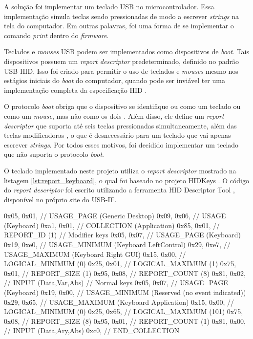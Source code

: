 \documentclass[brazil,pagestart=firstchapter]{abnt}
\begin{document}
A solução foi implementar um teclado \ac{USB} no microcontrolador. Essa
implementação simula teclas sendo pressionadas de modo a escrever
\textit{strings} na tela do computador. Em outras palavras, foi uma forma de
se implementar o comando \textit{print} dentro do \textit{firmware}.

Teclados e \textit{mouses} \ac{USB} podem ser implementados como
dispositivos de \textit{boot}. Tais dispositivos possuem um \textit{report
descriptor} predeterminado, definido no padrão \ac{USB} \ac{HID}. Isso foi
criado para permitir o uso de teclados e \textit{mouses} mesmo nos estágios
iniciais do \textit{boot} do computador, quando pode ser inviável ter uma
implementação completa da especificação \ac{HID} \cite{usbhid}.

O protocolo \textit{boot} obriga que o dispositivo se identifique ou como um
teclado ou como um \textit{mouse}, mas não como os dois \cite{usbhid}.
Além disso, ele define um \textit{report descriptor} que suporta até seis
teclas pressionadas simultaneamente, além das teclas modificadoras
\cite{usbhid}, o que é desnecessário para um teclado que vai apenas
escrever \textit{strings}. Por todos esses motivos, foi decidido implementar
um teclado que não suporta o protocolo \textit{boot}.

O teclado implementado neste projeto utiliza o \textit{report descriptor}
mostrado na listagem \ref{lst:report_keyboard}, o qual foi baseado no
projeto HIDKeys \cite{HIDKeys}. O código do \textit{report descriptor} foi
escrito utilizando a ferramenta HID Descriptor Tool \cite{hiddt}, disponível
no próprio site do \ac{USB-IF}.

\begin{ccode}[numbers=none, float=h, label={lst:report_keyboard},
	caption={\textit{Report descriptor} do teclado USB}
]
	0x05, 0x01,        // USAGE_PAGE (Generic Desktop)
	0x09, 0x06,        // USAGE (Keyboard)
	0xa1, 0x01,        // COLLECTION (Application)
	0x85, 0x01,	       //   REPORT_ID (1)
	// Modifier keys
	0x05, 0x07,        //   USAGE_PAGE (Keyboard)
	0x19, 0xe0,        //   USAGE_MINIMUM (Keyboard LeftControl)
	0x29, 0xe7,        //   USAGE_MAXIMUM (Keyboard Right GUI)
	0x15, 0x00,        //   LOGICAL_MINIMUM (0)
	0x25, 0x01,        //   LOGICAL_MAXIMUM (1)
	0x75, 0x01,        //   REPORT_SIZE (1)
	0x95, 0x08,        //   REPORT_COUNT (8)
	0x81, 0x02,        //   INPUT (Data,Var,Abs)
	// Normal keys
	0x05, 0x07,        //   USAGE_PAGE (Keyboard)
	0x19, 0x00,        //   USAGE_MINIMUM (Reserved (no event indicated))
	0x29, 0x65,        //   USAGE_MAXIMUM (Keyboard Application)
	0x15, 0x00,        //   LOGICAL_MINIMUM (0)
	0x25, 0x65,        //   LOGICAL_MAXIMUM (101)
	0x75, 0x08,        //   REPORT_SIZE (8)
	0x95, 0x01,        //   REPORT_COUNT (1)
	0x81, 0x00,        //   INPUT (Data,Ary,Abs)
	0xc0,              // END_COLLECTION
\end{ccode}
\end{document}
